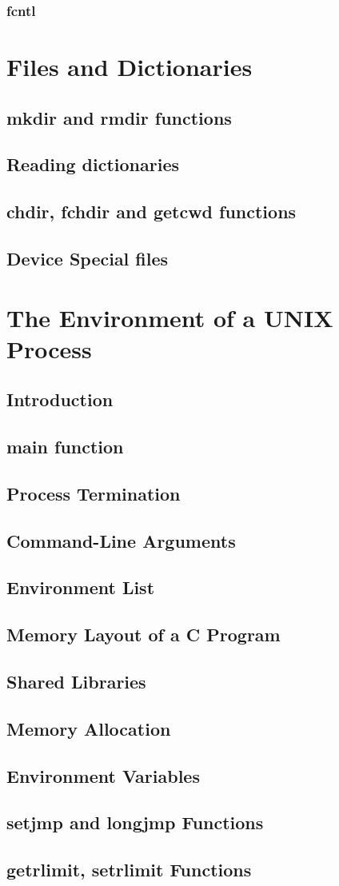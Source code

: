 \documentclass{article}
\begin{document}
\subsubsection{fcntl}

\section{Files and Dictionaries}
\subsection{mkdir and rmdir functions}
\subsection{Reading dictionaries}
\subsection{chdir, fchdir and getcwd functions}
\subsection{Device Special files}

\section{The Environment of a UNIX Process}
\subsection{Introduction}
\subsection{main function}
\subsection{Process Termination}
\subsection{Command-Line Arguments}
\subsection{Environment List}
\subsection{Memory Layout of a C Program}
\subsection{Shared Libraries}
\subsection{Memory Allocation}
\subsection{Environment Variables}
\subsection{setjmp and longjmp Functions}
\subsection{getrlimit, setrlimit Functions}
\end{document}

